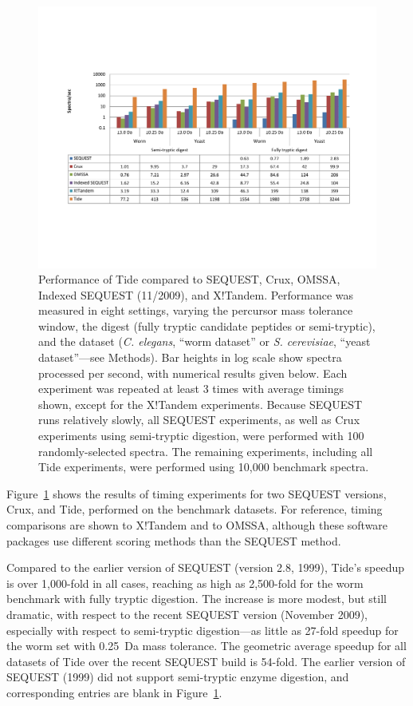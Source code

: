 \begin{figure}
\centering
\includegraphics[width=6.5in]{timing_chart_main-cropped.pdf}
\caption{Performance of Tide compared to SEQUEST, Crux, OMSSA, Indexed
  SEQUEST (11/2009), and X!Tandem. Performance was measured in eight
  settings, varying the percursor mass tolerance window, the digest
  (fully tryptic candidate peptides or semi-tryptic), and the dataset
  ({\it C. elegans}, ``worm dataset'' or {\it S. cerevisiae}, ``yeast
  dataset''---see Methods). Bar heights in log scale show
  spectra processed per second, with numerical results given
  below. Each experiment was repeated at least 3 times with average
  timings shown, except for the X!Tandem experiments. Because SEQUEST
  runs relatively slowly, all SEQUEST
  experiments, as well as Crux experiments using semi-tryptic digestion,
  were performed with 100 randomly-selected spectra. The remaining
  experiments, including all Tide experiments, were performed using
  10,000 benchmark spectra.
  \label{figure:perf-chart}}
\end{figure}

Figure~\ref{figure:perf-chart} shows the results of timing experiments
for two SEQUEST versions, Crux, and Tide, performed on the benchmark
datasets.  For reference, timing comparisons are shown to X!Tandem and
to OMSSA, although these software packages use different scoring
methods than the SEQUEST method.

Compared to the earlier version of SEQUEST (version 2.8, 1999), Tide's
speedup is over 1,000-fold in all cases, reaching as high as
2,500-fold for the worm benchmark with fully tryptic digestion. The
increase is more modest, but still dramatic, with respect to the
recent SEQUEST version (November 2009), especially with respect to
semi-tryptic digestion---as little as 27-fold speedup for the worm set with
0.25~Da mass tolerance. The geometric average speedup for all
datasets of Tide over the recent SEQUEST build is 54-fold. The earlier
version of SEQUEST (1999) did not support semi-tryptic enzyme digestion,
and corresponding entries are blank in Figure~\ref{figure:perf-chart}.

